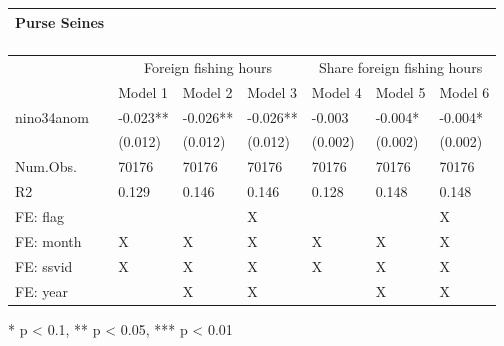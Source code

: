 \captionsetup[table]{labelformat=empty,skip=1pt}
\begin{longtable}{lllllll}
\caption*{
\large Purse Seines\\ 
\small \\ 
} \\ 
\toprule
& \multicolumn{3}{c}{Foreign fishing hours} & \multicolumn{3}{c}{Share foreign fishing hours} \\ 
 \cmidrule(lr){2-4}\cmidrule(lr){5-7}
  & Model 1 & Model 2 & Model 3 & Model 4 & Model 5 & Model 6 \\ 
\midrule
nino34anom & -0.023** & -0.026** & -0.026** & -0.003 & -0.004* & -0.004* \\ 
 & (0.012) & (0.012) & (0.012) & (0.002) & (0.002) & (0.002) \\ 
Num.Obs. & 70176 & 70176 & 70176 & 70176 & 70176 & 70176 \\ 
R2 & 0.129 & 0.146 & 0.146 & 0.128 & 0.148 & 0.148 \\ 
FE:  flag &  &  & X &  &  & X \\ 
FE:  month & X & X & X & X & X & X \\ 
FE:  ssvid & X & X & X & X & X & X \\ 
FE:  year &  & X & X &  & X & X \\ 
\bottomrule
\end{longtable}
\begin{minipage}{\linewidth}
* p < 0.1, ** p < 0.05, *** p < 0.01\\ 
\end{minipage}

